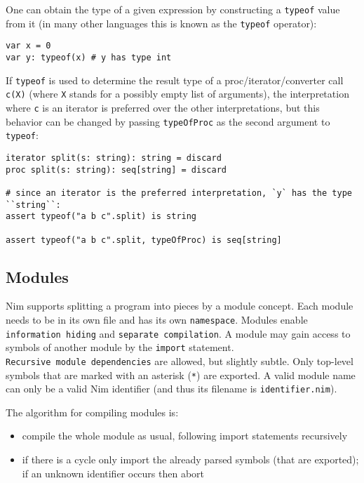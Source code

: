 One can obtain the type of a given expression by constructing a
\texttt{typeof} value from it (in many other languages this is known as
the \texttt{typeof} operator):

\begin{verbatim}
var x = 0
var y: typeof(x) # y has type int
\end{verbatim}

If \texttt{typeof} is used to determine the result type of a
proc/iterator/converter call \texttt{c(X)} (where \texttt{X} stands for
a possibly empty list of arguments), the interpretation where \texttt{c}
is an iterator is preferred over the other interpretations, but this
behavior can be changed by passing \texttt{typeOfProc} as the second
argument to \texttt{typeof}:

\begin{verbatim}
iterator split(s: string): string = discard
proc split(s: string): seq[string] = discard

# since an iterator is the preferred interpretation, `y` has the type ``string``:
assert typeof("a b c".split) is string

assert typeof("a b c".split, typeOfProc) is seq[string]
\end{verbatim}

\hypertarget{modules}{%
\subsection{Modules}\label{modules}}

Nim supports splitting a program into pieces by a module concept. Each
module needs to be in its own file and has its own \texttt{namespace}.
Modules enable \texttt{information\ hiding} and
\texttt{separate\ compilation}. A module may gain access to symbols of
another module by the \texttt{import} statement.
\texttt{Recursive\ module\ dependencies} are allowed, but slightly
subtle. Only top-level symbols that are marked with an asterisk
(\texttt{*}) are exported. A valid module name can only be a valid Nim
identifier (and thus its filename is \texttt{identifier.nim}).

The algorithm for compiling modules is:

\begin{itemize}
\tightlist
\item
  compile the whole module as usual, following import statements
  recursively
\item
  if there is a cycle only import the already parsed symbols (that are
  exported); if an unknown identifier occurs then abort
\end{itemize}

